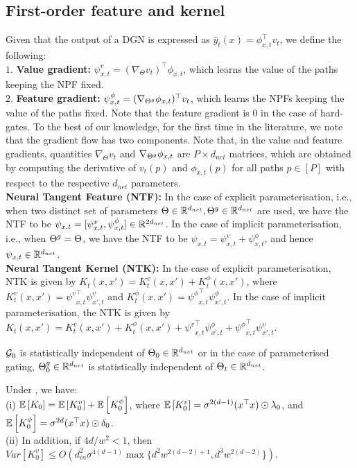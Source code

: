 \subsection{First-order feature and kernel}
Given that the output of a DGN is expressed as $\hat{y}_t(x)=\phi_{x,t}^\top v_t$, we define the following:\\
$1.$ \textbf{Value gradient:} $\psi_{x,t}^v=(\nabla_{\Theta}v_t)^\top  \phi_{x,t}$, which learns the value of the paths keeping the NPF fixed. \\
$2.$ \textbf{Feature gradient:}  $\psi_{x,t}^{\phi}=(\nabla_{{\Theta}^g}\phi_{x,t})^\top v_t $, which learns the NPFs keeping the value of the paths fixed. Note that the feature gradient is $0$ in the case of hard-gates.
To the best of our knowledge, for the first time in the literature, we note that the gradient flow has two components. Note that, in the value and feature gradients, quantities $\nabla_{\Theta}v_t$ and $\nabla_{{\Theta}^g}\phi_{x,t}$ are $P\times d_{net}$ matrices, which are obtained by computing the derivative of $v_t(p)$ and $\phi_{x,t}(p)$ for all paths $p\in[P]$ with respect to the respective $d_{net}$ parameters.\\
\textbf{Neural Tangent Feature (NTF):} In the case of explicit parameterisation, i.e., when two distinct set of parameters $\Theta\in\mathbb{R}^{d_{net}}, {\Theta}^g\in\mathbb{R}^{d_{net}}$ are used, we have the NTF to be $\psi_{x,t}=[\psi^v_{x,t},\psi^{\phi}_{x,t}]\in \mathbb{R}^{2d_{net}}$. In the case of implicit parameterisation, i.e., when ${\Theta}^g=\Theta$, we have the NTF to be $\psi_{x,t}=\psi^v_{x,t}+\psi^{\phi}_{x,t}$, and hence $\psi_{x,t}\in\mathbb{R}^{d_{net}}$.\\
\textbf{Neural Tangent Kernel (NTK):} In the case of explicit parameterisation, NTK is given by $K_t(x,x')=K^v_t(x,x')+K^{\phi}_t(x,x')$, where $K^v_t(x,x')={\psi^v}^\top_{x,t}\psi^v_{x',t}$ and $K^{\phi}_t(x,x')={\psi^{\phi}}^\top_{x,t}\psi^{\phi}_{x',t}$. In the case of implicit parameterisation, the NTK is given by $K_t(x,x')=K^v_t(x,x')+K^{\phi}_t(x,x')+{\psi^v}^\top_{x,t} \psi^{\phi}_{x',t} + {\psi^{\phi}}^\top_{x,t} \psi^{v}_{x',t}$.
\begin{assumption}\label{assmp:decouple}
$\mathcal{G}_0$ is statistically independent of $\Theta_0\in\mathbb{R}^{d_{net}}$ or in the case of parameterised gating, ${\Theta}^g_0\in\mathbb{R}^{d_{net}}$ is statistically independent of $\Theta_t\in\mathbb{R}^{d_{net}}$.
\end{assumption}
\begin{theorem} Under , we have:\\
(i) $\mathbb{E}\left[K_0\right]=\mathbb{E}\left[K^v_0\right]+\mathbb{E}\left[K^{\phi}_0\right]$, where $\mathbb{E}\left[K^{v}_0\right]=\sigma^{2(d-1)} (x^\top x)\odot \lambda_0$, and $\mathbb{E}\left[K^{\phi}_0\right]=\sigma^{2d}  (x^\top x)\odot \delta_0$.\\
(ii) In addition, if ${4d}/{w^2}<1$, then $Var\left[K^v_0\right]\leq O\left(d^2_{in}\sigma^{4(d-1)}\max\{d^2w^{2(d-2)+1}, d^3w^{2(d-2)}\}\right)$.
\end{theorem}
